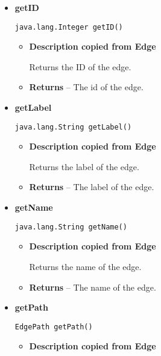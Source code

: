 {{{{{{{{{{{{{{{{{{\begin{itemize}
{\begin{itemize}
{Adds the edge to a \texttt{\small FastGraphAccessor}{\small 
{}}.
}
\item{
{\bf  Parameters}
  \begin{itemize}
   \item{
\texttt{fga} -- The \texttt{\small FastGraphAccessor}{\small 
{}} to whom this edge will be added.}
  \end{itemize}
}%
\end{itemize}
}%
\item{ 
{\bf  getID}\\
\begin{lstlisting}[frame=none]
java.lang.Integer getID()\end{lstlisting} %
\begin{itemize}
\item{
{\bf  Description copied from Edge{\small {}} }

Returns the ID of the edge.
}
\item{{\bf  Returns} -- 
The id of the edge. 
}%
\end{itemize}
}%
\item{ 
{\bf  getLabel}\\
\begin{lstlisting}[frame=none]
java.lang.String getLabel()\end{lstlisting} %
\begin{itemize}
\item{
{\bf  Description copied from Edge{\small {}} }

Returns the label of the edge.
}
\item{{\bf  Returns} -- 
The label of the edge. 
}%
\end{itemize}
}%
\item{ 
{\bf  getName}\\
\begin{lstlisting}[frame=none]
java.lang.String getName()\end{lstlisting} %
\begin{itemize}
\item{
{\bf  Description copied from Edge{\small {}} }

Returns the name of the edge.
}
\item{{\bf  Returns} -- 
The name of the edge. 
}%
\end{itemize}
}%
\item{ 
{\bf  getPath}\\
\begin{lstlisting}[frame=none]
EdgePath getPath()\end{lstlisting} %
\begin{itemize}
\item{
{\bf  Description copied from Edge{\small {}} }

}
\end{itemize}}
\end{itemize}}}}}}}}}}}}}}}}}}}
